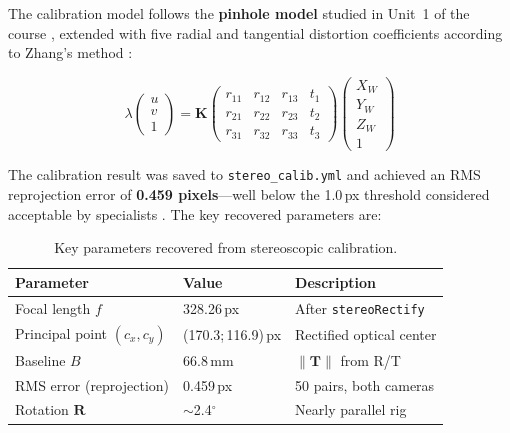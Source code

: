 \documentclass[12pt, a4paper]{article}
\begin{document}
The calibration model follows the \textbf{pinhole model} studied in Unit~1 of the
course \cite{robles2026unidad1}, extended with five radial and tangential distortion
coefficients according to Zhang's method \cite{zhang2000flexible}:

\begin{equation}
\label{eq:proj}
  \lambda \begin{pmatrix} u \\ v \\ 1 \end{pmatrix}
  = \mathbf{K}
  \begin{pmatrix} r_{11} & r_{12} & r_{13} & t_1 \\
                  r_{21} & r_{22} & r_{23} & t_2 \\
                  r_{31} & r_{32} & r_{33} & t_3 \end{pmatrix}
  \begin{pmatrix} X_W \\ Y_W \\ Z_W \\ 1 \end{pmatrix}
\end{equation}

The calibration result was saved to \texttt{stereo\_calib.yml} and achieved an RMS
reprojection error of \textbf{0.459 pixels}---well below the 1.0\,px threshold
considered acceptable by specialists \cite{szeliski2022computer}. The key recovered
parameters are:

\begin{table}[htbp]
\centering
\caption{Key parameters recovered from stereoscopic calibration.}
\label{tab:calib}
\begin{tabular}{l l p{4.5cm}}
\toprule
\textbf{Parameter}              & \textbf{Value}        & \textbf{Description} \\
\midrule
Focal length $f$                & 328.26\,px            & After \texttt{stereoRectify} \\
Principal point $(c_x,c_y)$     & (170.3;\,116.9)\,px   & Rectified optical center \\
Baseline $B$                    & 66.8\,mm              & $\lVert\mathbf{T}\rVert$ from R/T \\
RMS error (reprojection)        & 0.459\,px             & 50 pairs, both cameras \\
Rotation $\mathbf{R}$           & $\sim$2.4$^{\circ}$   & Nearly parallel rig \\
\bottomrule
\end{tabular}
\end{table}
\end{document}
